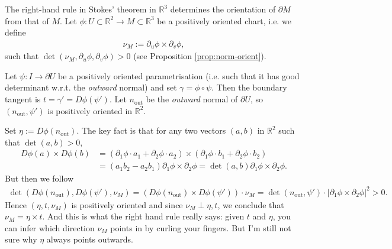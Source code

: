 \begin{remark}
	The right-hand rule in Stokes' theorem in $\mathbb{R}^3$ determines the orientation of $\partial M$ from that of $M$. Let $\phi:U\subset\mathbb{R}^2\to M\subset\mathbb{R}^3$ be a positively oriented chart, i.e. we define
	\begin{align*}
		\nu_M := \partial_u\phi \times \partial_v\phi,
	\end{align*}
	such that $\det (\nu_{M}, \partial_{u} \phi, \partial_{v} \phi) > 0$ (see Proposition \ref{prop:norm-orient}). 

	Let $\psi:I\to\partial U$ be a positively oriented parametrisation (i.e. such that it has good determinant w.r.t. the \textit{outward} normal) and set $\gamma=\phi\circ\psi$. Then the boundary tangent is $t=\gamma'=D\phi(\psi')$. Let $n_{\mathrm{out}}$ be the \textit{outward} normal of $\partial U$, so $(n_{\mathrm{out}},\psi')$ is positively oriented in $\mathbb{R}^2$.

	Set $\eta:=D\phi(n_{\mathrm{out}})$. The key fact is that for any two vectors $(a,b)$ in $\mathbb{R}^2$ such that $\det (a, b) > 0$,
	\begin{align*}
		D\phi(a)\times D\phi(b) &= (\partial_{1}\phi \cdot a_{1} + \partial_{2} \phi \cdot a_{2}) \times (\partial_{1} \phi \cdot b_{1} + \partial_{2} \phi \cdot b_{2}) \\ 
		&= (a_{1} b_{2} - a_{2} b_{1}) \partial_{1} \phi \times \partial_{2} \phi = \det (a,b) \partial_{1} \phi \times \partial_{2} \phi.
	\end{align*}
	But then we follow
	\begin{align*}
		\det (D \phi(n_{\text{out}}), D \phi( \psi'), \nu_{M}) = (D\phi(n_{\text{out}}) \times D\phi(\psi')) \cdot \nu_{M} = \det (n_{\text{out}}, \psi') \cdot \left| \partial_{1} \phi \times \partial_{2} \phi \right|^{2} > 0.
	\end{align*}	
	Hence $(\eta,t,\nu_M)$ is positively oriented and since $\nu_{M} \perp \eta, t$, we conclude that $\nu_{M} = \eta \times t$. And this is what the right hand rule really says: given $t$ and $\eta$, you can infer which direction $\nu_{M}$ points in by curling your fingers. But I'm still not sure why $\eta$ always points outwards.
\end{remark}

